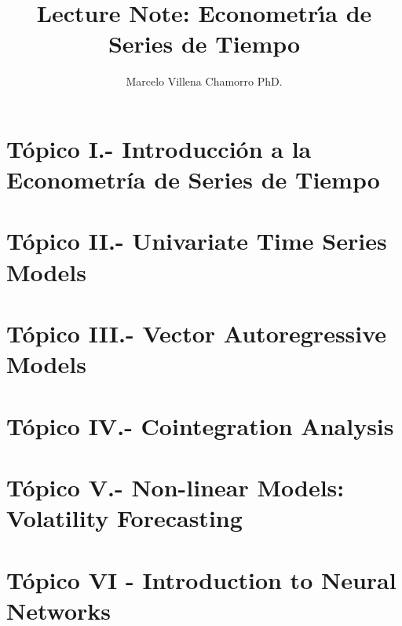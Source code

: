 \documentclass{easyclass}
\begin{document}
\begin{titlepage}
    \title{Lecture Note: Econometr\'\i{}a de Series de Tiempo }
    \author{Marcelo Villena Chamorro PhD.}
    \maketitle
\end{titlepage}

\tableofcontents

\chapter{Tópico I.- Introducción a la Econometría de Series de Tiempo}

\chapter{Tópico II.- Univariate Time Series Models}

\chapter{Tópico III.- Vector Autoregressive Models}

\chapter{Tópico IV.- Cointegration Analysis}

\chapter{T\'opico V.- Non-linear Models: Volatility Forecasting}

\chapter{T\'opico VI - Introduction to Neural Networks}




\end{document}
